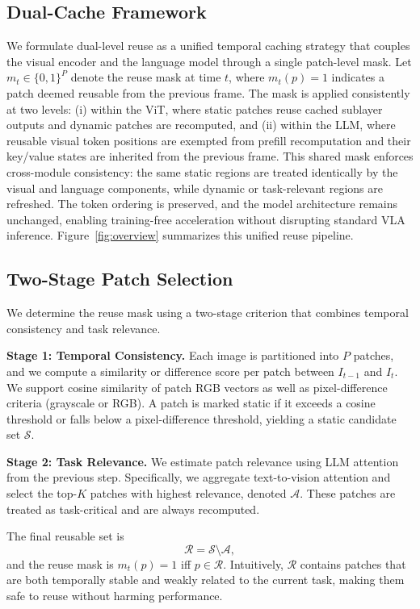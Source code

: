 \documentclass[lettersize,journal]{IEEEtran}
\begin{document}
\subsection{Dual-Cache Framework}
We formulate dual-level reuse as a unified temporal caching strategy that couples the visual encoder and the language model through a single patch-level mask. Let $m_t \in \{0,1\}^P$ denote the reuse mask at time $t$, where $m_t(p)=1$ indicates a patch deemed reusable from the previous frame. The mask is applied consistently at two levels: (i) within the ViT, where static patches reuse cached sublayer outputs and dynamic patches are recomputed, and (ii) within the LLM, where reusable visual token positions are exempted from prefill recomputation and their key/value states are inherited from the previous frame. This shared mask enforces cross-module consistency: the same static regions are treated identically by the visual and language components, while dynamic or task-relevant regions are refreshed. The token ordering is preserved, and the model architecture remains unchanged, enabling training-free acceleration without disrupting standard VLA inference. Figure~\ref{fig:overview} summarizes this unified reuse pipeline.


\subsection{Two-Stage Patch Selection}
We determine the reuse mask using a two-stage criterion that combines temporal consistency and task relevance.

\textbf{Stage 1: Temporal Consistency.} Each image is partitioned into $P$ patches, and we compute a similarity or difference score per patch between $I_{t-1}$ and $I_t$. We support cosine similarity of patch RGB vectors as well as pixel-difference criteria (grayscale or RGB). A patch is marked static if it exceeds a cosine threshold or falls below a pixel-difference threshold, yielding a static candidate set $\mathcal{S}$.

\textbf{Stage 2: Task Relevance.} We estimate patch relevance using LLM attention from the previous step. Specifically, we aggregate text-to-vision attention and select the top-$K$ patches with highest relevance, denoted $\mathcal{A}$. These patches are treated as task-critical and are always recomputed.

The final reusable set is
\[
\mathcal{R} = \mathcal{S} \setminus \mathcal{A},
\]
and the reuse mask is $m_t(p)=1$ iff $p \in \mathcal{R}$. Intuitively, $\mathcal{R}$ contains patches that are both temporally stable and weakly related to the current task, making them safe to reuse without harming performance.
\end{document}
